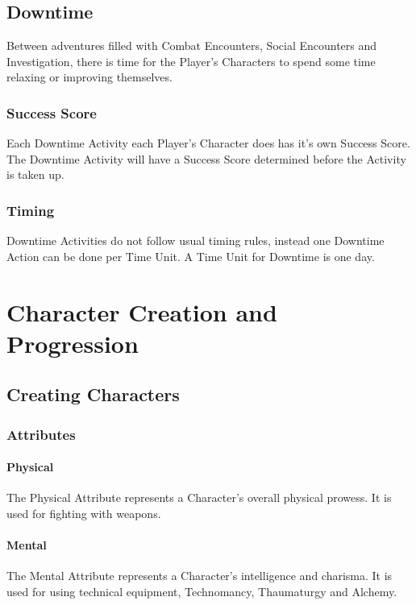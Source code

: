 \documentclass[a4paper,12pt,oneside]{book}
\begin{document}
        \section{Downtime}
            Between adventures filled with Combat Encounters, Social Encounters and Investigation, there is time for the Player's Characters to spend some time relaxing or improving themselves.

            \subsection{Success Score}
                Each Downtime Activity each Player's Character does has it's own Success Score. The Downtime Activity will have a Success Score determined before the Activity is taken up.

            \subsection{Timing}
                Downtime Activities do not follow usual timing rules, instead one Downtime Action can be done per Time Unit. A Time Unit for Downtime is one day.

    \chapter{Character Creation and Progression}
        \section{Creating Characters}
            \subsection{Attributes}
                \subsubsection{Physical}
                    The Physical Attribute represents a Character's overall physical prowess. It is used for fighting with weapons.
                \subsubsection{Mental}
                    The Mental Attribute represents a Character's intelligence and charisma. It is used for using technical equipment, Technomancy, Thaumaturgy and Alchemy.
\end{document}
